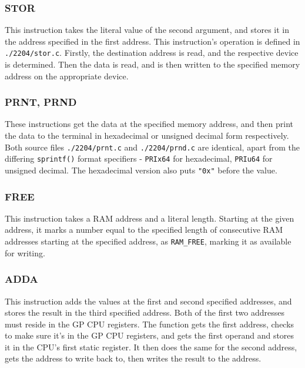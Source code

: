 \documentclass[a4paper,11pt]{article}
\begin{document}
        \subsubsection{STOR}
            This instruction takes the literal value of the second argument, and stores it in the address specified in the first address. This instruction's operation is defined in \lstinline{./2204/stor.c}. Firstly, the destination address is read, and the respective device is determined. Then the data is read, and is then written to the specified memory address on the appropriate device.
            
        \subsubsection{PRNT, PRND}
            These instructions get the data at the specified memory address, and then print the data to the terminal in hexadecimal or unsigned decimal form respectively. Both source files \lstinline{./2204/prnt.c} and \lstinline{./2204/prnd.c} are identical, apart from the differing \lstinline{sprintf()} format specifiers - \lstinline{PRIx64} for hexadecimal, \lstinline{PRIu64} for unsigned decimal. The hexadecimal version also puts \lstinline{"0x"} before the value.
            
        \subsubsection{FREE}
            This instruction takes a RAM address and a literal length. Starting at the given address, it marks a number equal to the specified length of consecutive RAM addresses starting at the specified address, as \lstinline{RAM_FREE}, marking it as available for writing.
            
        \subsubsection{ADDA}
            This instruction adds the values at the first and second specified addresses, and stores the result in the third specified address. Both of the first two addresses must reside in the GP CPU registers. The function gets the first address, checks to make sure it's in the GP CPU registers, and gets the first operand and stores it in the CPU's first static register. It then does the same for the second address, gets the address to write back to, then writes the result to the address.
            
\end{document}
